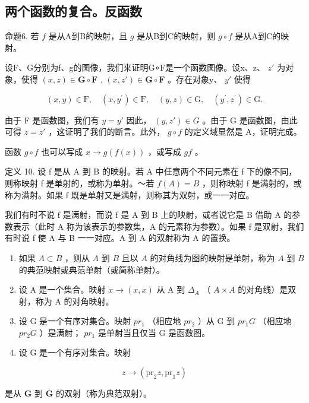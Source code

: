 \subsection{两个函数的复合。反函数}

命题6. 若 \(f\) 是从A到B的映射，且 \(g\) 是从B到C的映射，则 \(g \circ f\) 是从A到C的映射。

设F、G分别为f、g的图像，我们来证明G∘F是一个函数图像。设x、z、 \(z'\) 为对象，使得 \((x, z) \in \mathbf{G} \circ \mathbf{F}\) , \((x, z') \in \mathbf{G} \circ \mathbf{F}\) 。存在对象y、 \(y'\) 使得

\[
(x, y) \in \mathrm{F}, \quad (x, y ^ {\prime}) \in \mathrm{F}, \quad (y, z) \in \mathrm{G}, \quad (y ^ {\prime}, z ^ {\prime}) \in \mathrm{G}.
\]

由于 F 是函数图，我们有 \(y = y'\) 因此， \((y, z') \in G\) 。由于 G 是函数图，由此可得 \(z = z'\) ，这证明了我们的断言。此外， \(g \circ f\) 的定义域显然是 A，证明完成。

函数 \(g \circ f\) 也可以写成 \(x \to g(f(x))\) ，或写成 \(gf\) 。

定义 10. 设 f 是从 A 到 B 的映射。若 A 中任意两个不同元素在 f 下的像不同，则称映射 f 是单射的，或称为单射。～若 \(f(A) = B\) ，则称映射 f 是满射的，或称为满射。如果 f 既是单射又是满射，则称其为双射，或一一对应。

我们有时不说 f 是满射，而说 f 是 A 到 B 上的映射，或者说它是 B 借助 A 的参数表示（此时 A 称为该表示的参数集，A 的元素称为参数）。如果 f 是双射，我们有时说 f 使 A 与 B 一一对应。A 到 A 的双射称为 A 的置换。


\begin{enumerate}
\def\labelenumi{(\arabic{enumi})}
\item
  如果 \(A \subset B\) ，则从 \(A\) 到 \(B\) 且以 \(A\) 的对角线为图的映射是单射，称为 \(A\) 到 \(B\) 的典范映射或典范单射（或简称单射）。
\item
  设 A 是一个集合。映射 \(x \to (x, x)\) 从 A 到 \(\Delta_{A}\) （ \(A \times A\) 的对角线）是双射，称为 A 的对角映射。
\item
  设 G 是一个有序对集合。映射 \(pr_{1}\) （相应地 \(pr_{2}\) ）从 G 到 \(pr_{1}G\) （相应地 \(pr_{2}G\) ）是满射； \(pr_{1}\) 是单射当且仅当 G 是函数图。
\item
  设 G 是一个有序对集合。映射
\end{enumerate}

\[
z \rightarrow (\mathrm{pr} _ {2} z, \mathrm{pr} _ {1} z)
\]

是从 \(\mathbf{G}\) 到 \(\overline{\mathbf{G}}\) 的双射（称为典范双射）。


